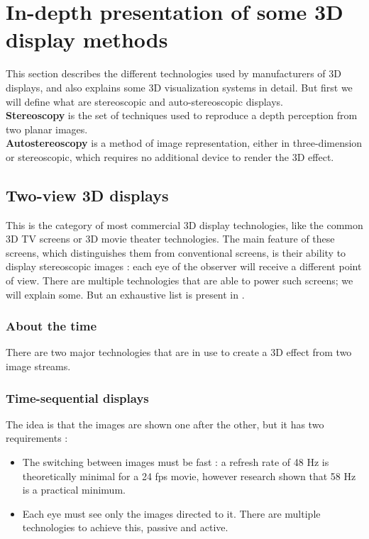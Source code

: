 \section{In-depth presentation of some 3D display methods}
This section describes the different technologies used by manufacturers of 3D displays, and also explains some 3D visualization systems in detail. But first we will define what are stereoscopic and auto-stereoscopic displays. \\
\textbf{Stereoscopy} is the set of techniques used to reproduce a depth perception from two planar images.\\
\textbf{Autostereoscopy} is a method of image representation, either in three-dimension or stereoscopic, which requires no additional device to render the 3D effect. 


\subsection{Two-view 3D displays}
This is the category of most commercial 3D display technologies, like the common 3D TV screens or 3D movie theater technologies. The main feature of these screens, which distinguishes them from conventional screens, is their ability to display stereoscopic images : each eye of the observer will receive a different point of view.
There are multiple technologies that are able to power such screens; we will explain some. But an exhaustive list is present in \cite{mehrabi2013making}.

\subsubsection{About the time}
There are two major technologies that are in use to create a 3D effect from two image streams.
\subsubsection{Time-sequential displays}
The idea is that the images are shown one after the other, but it has two requirements : 
\begin{itemize}
\item The switching between images must be fast : a refresh rate of 48 Hz is theoretically minimal for a 24 fps movie, however research \cite{holliman2011three} shown that 58 Hz is a practical minimum.
\item Each eye must see only the images directed to it. There are multiple technologies to achieve this, passive and active.
\end{itemize}

